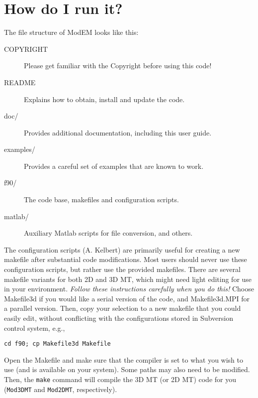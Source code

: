 \documentclass[12pt]{article}
\begin{document}
\section{How do I run it?}

The file structure of ModEM looks like this:

\begin{description}
  \item[COPYRIGHT] Please get familiar with the Copyright before using this code!
  \item[README] Explains how to obtain, install and update the code.
  \item[doc/] Provides additional documentation, including this user guide.
  \item[examples/] Provides a careful set of examples that are known to work.
  \item[f90/] The code base, makefiles and configuration scripts.
  \item[matlab/] Auxiliary Matlab scripts for file conversion, and others.
\end{description}

The configuration scripts (A. Kelbert) are primarily useful for creating a new makefile
after substantial code modifications.   Most users should never use these configuration
scripts, but rather use the provided makefiles.
There are several makefile variants for both 2D and 3D MT, which might need
light editing for use in your environment. 
\emph{Follow these instructions carefully when you do this!} 
Choose Makefile3d if you would like a serial version of the code, 
and Makefile3d.MPI for a parallel version. Then, copy your selection to 
a new makefile that you could easily edit, without conflicting with 
the configurations stored in Subversion control system, e.g.,
\begin{verbatim}
cd f90; cp Makefile3d Makefile
\end{verbatim}

Open the Makefile and make sure that the
compiler is set to what you wish to use (and is available on your system).
Some paths may also need to be modified.
Then, the \verb"make" command will 
compile the 3D MT (or 2D MT) code for you (\verb"Mod3DMT" and \verb"Mod2DMT", respectively).\\
\end{document}
